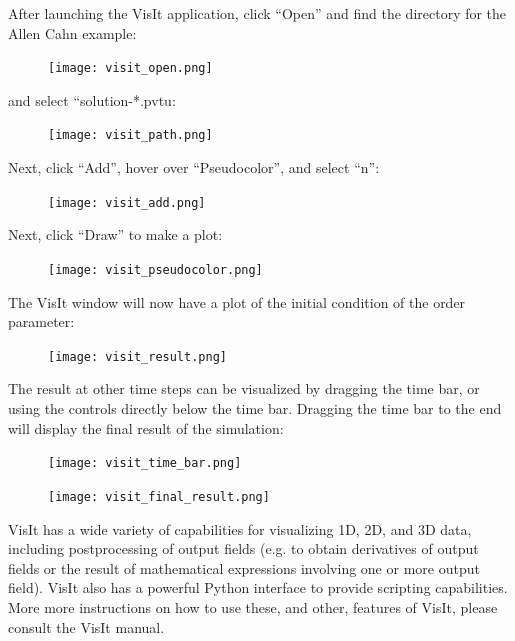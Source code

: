 \documentclass[10pt]{article} %
\begin{document}
After launching the VisIt application, click ``Open'' and find the directory for the Allen Cahn example:
\begin{figure}[H]
\vspace{0pt}
\centering
\texttt{[image: visit\_open.png]}
\vspace{0pt}
\end{figure}
and select ``solution-*.pvtu:
\begin{figure}[H]
\vspace{0pt}
\centering
\texttt{[image: visit\_path.png]}
\vspace{0pt}
\end{figure}
Next, click ``Add'', hover over ``Pseudocolor'', and select ``n'':
\begin{figure}[H]
\vspace{0pt}
\centering
\texttt{[image: visit\_add.png]}
\vspace{0pt}
\end{figure}
Next, click ``Draw'' to make a plot:
\begin{figure}[H]
\vspace{0pt}
\centering
\texttt{[image: visit\_pseudocolor.png]}
\vspace{0pt}
\end{figure}
The VisIt window will now have a plot of the initial condition of the order parameter:
\begin{figure}[H]
\vspace{0pt}
\centering
\texttt{[image: visit\_result.png]}
\vspace{0pt}
\end{figure}
The result at other time steps can be visualized by dragging the time bar, or using the controls directly below the time bar. Dragging the time bar to the end will display the final result of the simulation:
\begin{figure}[H]
\vspace{0pt}
\centering
\texttt{[image: visit\_time\_bar.png]}
\vspace{0pt}
\end{figure}
\begin{figure}[H]
\vspace{0pt}
\centering
\texttt{[image: visit\_final\_result.png]}
\vspace{0pt}
\end{figure}

VisIt has a wide variety of capabilities for visualizing 1D, 2D, and 3D data, including postprocessing of output fields (e.g. to obtain derivatives of output fields or the result of mathematical expressions involving one or more output field). VisIt also has a powerful Python interface to provide scripting capabilities. More more instructions on how to use these, and other, features of VisIt, please consult the VisIt manual.
\end{document}
